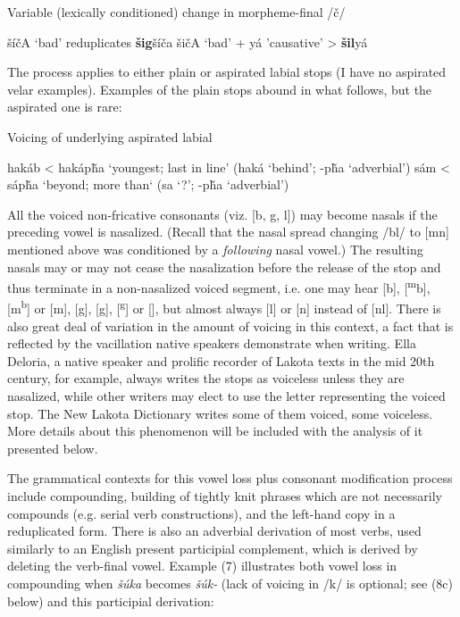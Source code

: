 \documentclass[output=paper]{LSP/langsci}
\begin{document}
\begin{exe}
\ex Variable (lexically conditioned) change in morpheme-final /\v{c}/
\begin{xlist}
\ex \v{s}\'i\v{c}A `bad' reduplicates \textbf{\v{s}ig}\v{s}\'i\v{c}a
\ex \v{s}i\v{c}A `bad' + y\'a 'causative' > \textbf{\v{s}il}y\'a
\end{xlist}
\end{exe}

The process applies to either plain or aspirated labial stops (I have no aspirated velar examples). Examples of the plain stops abound in what follows, but the aspirated one is rare:

\begin{exe}
\ex Voicing of underlying aspirated labial
\begin{xlist}
\ex hak\'ab < hak\'ap\v{h}a `youngest; last in line' (hak\'a `behind'; -p\v{h}a `adverbial')
\ex s\'am < s\'ap\v{h}a `beyond; more than` (sa `?'; -p\v{h}a `adverbial')
\end{xlist}
\end{exe}

All the voiced non-fricative consonants (viz. [b, g, l]) may become nasals if the preceding vowel is nasalized. (Recall that the nasal spread changing /bl/ to [mn] mentioned above was conditioned by a \textit{following} nasal vowel.) The resulting nasals may or may not cease the nasalization before the release of the stop and thus terminate in a non-nasalized voiced segment, i.e. one may hear [b], [\textsuperscript{m}b], [m\textsuperscript{b}] or [m], [g], [\textsuperscript{}g], [\textsuperscript{g}] or [], but almost always [l] or [n] instead of [nl]. There is also great deal of variation in the amount of voicing in this context, a fact that is reflected by the vacillation native speakers demonstrate when writing. Ella Deloria, a native speaker and prolific recorder of Lakota texts in the mid 20th century, for example, always writes the stops as voiceless unless they are nasalized, while other writers may elect to use the letter representing the voiced stop. The New Lakota Dictionary writes some of them voiced, some voiceless. More details about this phenomenon will be included with the analysis of it presented below.

The grammatical contexts for this vowel loss plus consonant modification process include compounding, building of tightly knit phrases which are not necessarily compounds (e.g. serial verb constructions), and the left-hand copy in a reduplicated form. There is also an adverbial derivation of most verbs, used similarly to an English present participial complement, which is derived by deleting the verb-final vowel. Example (7) illustrates both vowel loss in compounding when \textit{\v{s}\'uka} becomes \textit{\v{s}\'uk-} (lack of voicing in /k/ is optional; see (8c) below) and this participial derivation:
\end{document}
